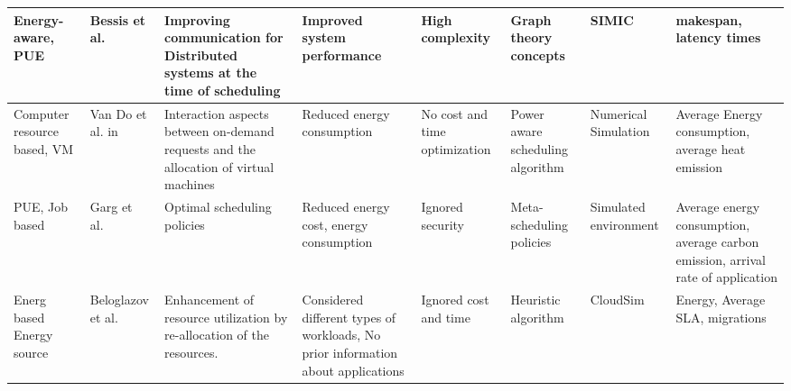 \begin{table*}[!htbp]
{\begin{tabular}{|g{2cm} p{1.5cm} p{2cm} p{2cm} p{2cm} p{2cm} p{2cm} p{2cm}|}
Energy-aware, PUE & Bessis et al.~\cite{bessis2013using} & Improving communication for Distributed systems at the time of scheduling & Improved system performance & High complexity & Graph theory concepts & SIMIC & makespan, latency times 
\\ \hline 

Computer resource based, VM & Van Do et al. in~\cite{van2012comparison} & Interaction aspects between on-demand requests and the allocation of virtual machines & Reduced energy consumption & No cost and time optimization & Power aware scheduling algorithm & Numerical Simulation & Average Energy consumption, average heat emission 
\\ \hline

PUE, Job based & Garg et al.~\cite{garg2011environment} &  Optimal scheduling policies & Reduced energy cost, energy consumption & Ignored security & Meta-scheduling policies & Simulated environment  & Average energy consumption, average carbon emission, arrival rate of application 
 \\ \hline
 
Energ based Energy source & Beloglazov et al.~\cite{beloglazov2010energy} &  Enhancement of resource utilization by re-allocation of the resources. & Considered different types of workloads, No prior information about applications & Ignored cost and time & Heuristic algorithm & CloudSim & Energy, Average SLA, migrations
\\ \hline

\end{tabular}
}
\end{table*}
